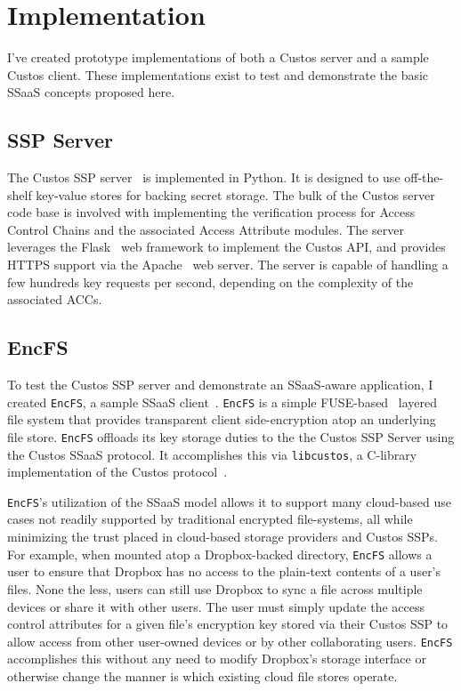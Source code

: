 \section{Implementation}

I've created prototype implementations of both a Custos server and a
sample Custos client. These implementations exist to test and
demonstrate the basic SSaaS concepts proposed here.

\subsection{SSP Server}

The Custos SSP server~\cite{custos-repo-server} is implemented in
Python. It is designed to use off-the-shelf key-value stores for
backing secret storage. The bulk of the Custos server code base is
involved with implementing the verification process for Access Control
Chains and the associated Access Attribute modules. The server
leverages the Flask~\cite{python-flask} web framework to implement the
Custos API, and provides HTTPS support via the Apache~\cite{apache}
web server. The server is capable of handling a few hundreds key
requests per second, depending on the complexity of the associated
ACCs.

\subsection{EncFS}

To test the Custos SSP server and demonstrate an SSaaS-aware
application, I created \texttt{EncFS}, a sample SSaaS
client~\cite{custos-repo-encfs}. \texttt{EncFS} is a simple
FUSE-based~\cite{fuse} layered file system that provides transparent
client side-encryption atop an underlying file store. \texttt{EncFS}
offloads its key storage duties to the the Custos SSP Server using the
Custos SSaaS protocol. It accomplishes this via \texttt{libcustos}, a
C-library implementation of the Custos
protocol~\cite{custos-repo-libcustos}.

\texttt{EncFS}'s utilization of the SSaaS model allows it to support
many cloud-based use cases not readily supported by traditional
encrypted file-systems, all while minimizing the trust placed in
cloud-based storage providers and Custos SSPs. For example, when
mounted atop a Dropbox-backed directory, \texttt{EncFS} allows a user
to ensure that Dropbox has no access to the plain-text contents of a
user's files. None the less, users can still use Dropbox to sync a
file across multiple devices or share it with other users. The user
must simply update the access control attributes for a given file's
encryption key stored via their Custos SSP to allow access from other
user-owned devices or by other collaborating users. \texttt{EncFS}
accomplishes this without any need to modify Dropbox's storage
interface or otherwise change the manner is which existing cloud file
stores operate.

